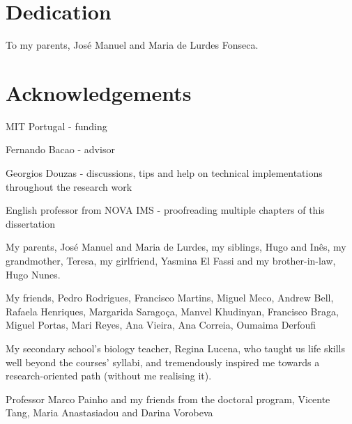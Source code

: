 \chapter*{Dedication}

To my parents, José Manuel and Maria de Lurdes Fonseca. 

\chapter*{Acknowledgements}

MIT Portugal - funding

Fernando Bacao - advisor

Georgios Douzas - discussions, tips and help on technical implementations
throughout the research work

English professor from NOVA IMS - proofreading multiple chapters of this
dissertation

My parents, José Manuel and Maria de Lurdes, my siblings, Hugo and Inês, my
grandmother, Teresa, my girlfriend, Yasmina El Fassi and my brother-in-law,
Hugo Nunes. 

My friends, Pedro Rodrigues, Francisco Martins, Miguel Meco,
Andrew Bell, Rafaela Henriques, Margarida Saragoça, Manvel Khudinyan,
Francisco Braga, Miguel Portas, Mari Reyes, Ana Vieira, Ana Correia, Oumaima
Derfoufi

My secondary school's biology teacher, Regina Lucena, who taught us life
skills well beyond the courses' syllabi, and tremendously inspired me towards
a research-oriented path (without me realising it).

Professor Marco Painho and my friends from the doctoral program, Vicente Tang,
Maria Anastasiadou and Darina Vorobeva
